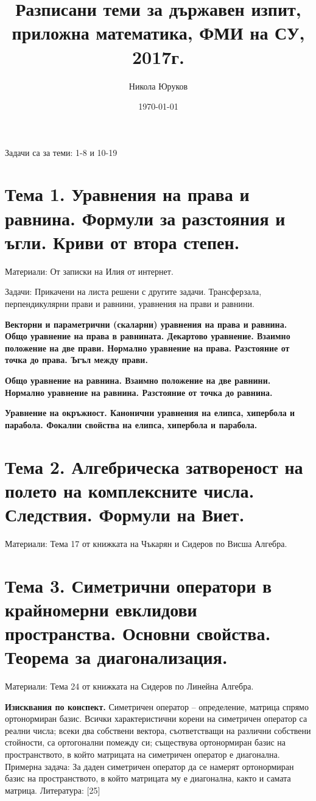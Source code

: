 \documentclass[11pt]{article}
\title{Разписани теми за държавен изпит, приложна математика, ФМИ на СУ, 2017г.}
\author{Никола Юруков}
\date{\today}
\numberwithin{equation}{section}
\numberwithin{figure}{section}
\numberwithin{table}{section}
\theoremstyle{plain}
\theoremstyle{definition}
\theoremstyle{remark}
\theoremstyle{definition}
\theoremstyle{remark}
\theoremstyle{plain}
\theoremstyle{definition}
\theoremstyle{definition}
\theoremstyle{plain}
\theoremstyle{plain}
\theoremstyle{plain}
\theoremstyle{definition}
\theoremstyle{plain}
\begin{document}
\maketitle

\clearpage

\tableofcontents

\clearpage

Задачи са за теми: 1-8 и 10-19

\section{Тема 1. Уравнения на права и равнина. Формули за разстояния и ъгли. Криви от втора степен.}

Материали: От записки на Илия от интернет.

Задачи: Прикачени на листа решени с другите задачи. Трансферзала, перпендикулярни прави и равнини, уравнения на прави и равнини.

\textbf{Векторни и параметрични (скаларни) уравнения на права и равнина. Общо уравнение на права в равнината. Декартово уравнение. Взаимно положение на две прави. Нормално уравнение на права. Разстояние от точка до права. Ъгъл между прави.}

\textbf{Общо уравнение на равнина. Взаимно положение на две равнини. Нормално уравнение на равнина. Разстояние от точка до равнина.}

\textbf{Уравнение на окръжност. Канонични уравнения на елипса, хипербола и парабола. Фокални свойства на елипса, хипербола и парабола.}

\section{Тема 2. Алгебрическа затвореност на полето на комплексните числа. Следствия. Формули на Виет.}

Материали: Тема 17 от книжката на Чъкарян и Сидеров по Висша Алгебра.

\section{Тема 3. Симетрични оператори в крайномерни евклидови пространства. Основни свойства. Теорема за
диагонализация.}

Материали: Тема 24 от книжката на Сидеров по Линейна Алгебра.

\hrulefill

\textbf{Изисквания по конспект.} Симетричен оператор – определение, матрица спрямо ортонормиран базис. Всички характеристични
корени на симетричен оператор са реални числа; всеки два собствени вектора, съответстващи на различни
собствени стойности, са ортогонални помежду си; съществува ортонормиран базис на пространството, в който
матрицата на симетричен оператор е диагонална.
Примерна задача: За даден симетричен оператор да се намерят ортонормиран базис на пространството,
в който матрицата му е диагонална, както и самата матрица.
Литература: [25]
\end{document}
